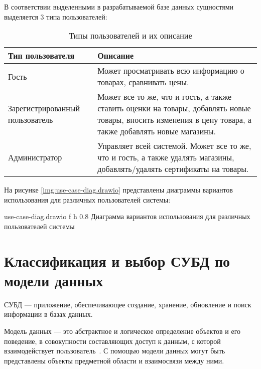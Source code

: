 В соответствии выделенными в разрабатываемой базе данных сущностями выделяется 3 типа пользователей:

\begin{table}[ht]
	\begin{center}
		\begin{threeparttable}
			\caption{Типы пользователей и их описание}
			\label{tbl:db_roles}
			\begin{tabular}{|p{4.5cm}|p{10cm}|}
					\hline
					\textbf{Тип пользователя} & \textbf{Описание} \\ \hline
					Гость & Может просматривать всю информацию о товарах, сравнивать цены. \\
					\hline
					Зарегистрированный пользователь & Может все то же, что и гость, а также ставить оценки на товары, добавлять новые товары, вносить изменения в цену товара, а также добавлять новые магазины. \\
					\hline
					Администратор & Управляет всей системой. Может все то же, что и гость, а также удалять магазины, добавлять/удалять сертификаты на товары. \\ 
					\hline
				\end{tabular}
		\end{threeparttable}
	\end{center}
\end{table}

\clearpage

На рисунке \ref{img:use-case-diag.drawio} представлены диаграммы вариантов использования для различных пользователей системы:

{use-case-diag.drawio} %
{f} %
{h} %
{0.8\textwidth} %
{Диаграмма вариантов использования для различных пользователей системы} %

\clearpage

\section{Классификация и выбор СУБД по модели данных}

СУБД --- приложение, обеспечивающее создание, хранение, обновление и поиск информации в базах данных.

Модель данных --- это абстрактное и логическое определение объектов и его поведение, в совокупности составляющих доступ к данным, с которой взаимодействует пользователь~\cite{info_intro_db_williams}. С помощью модели данных могут быть представлены объекты предметной области и взаимосвязи между ними.

